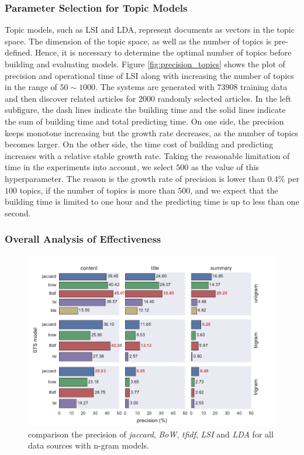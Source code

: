 \subsubsection{Parameter Selection for Topic Models}


Topic models, such as LSI and LDA, represent documents as vectors in the topic space. The dimension of the topic space, as well as the number of topics is pre-defined. Hence, it is necessary to determine the optimal number of topics before building and evaluating models. Figure \ref{fig:precision_topics} shows the plot of precision and operational time of LSI along with increasing the number of topics in the range of $50 \sim 1000$. The systems are generated with $73908$ training data and then discover related articles for $2000$ randomly selected articles. In the left subfigure, the dash lines indicate the building time and the solid lines indicate the sum of building time and total predicting time. On one side, the precision keeps monotone increasing  but the growth rate decreases, as the number of topics becomes larger. On the other side, the time cost of building and predicting increases with a relative stable growth rate. Taking the reasonable limitation of time in the experiments into account, we select $500$ as the value of this hyperparameter. The reason is the growth rate of precision is lower than $0.4\%$ per $100$ topics, if the number of topics is more than $500$, and we expect that the building time is limited to one hour and the predicting time is up to less than one second. 

\subsubsection{Overall Analysis of Effectiveness}

\begin{figure}[!htb]
    \centering
    \includegraphics[width=\textwidth]{fig/precision_2_3}
    \caption{comparison the precision of \textit{jaccard}, \textit{BoW}, \textit{tfidf}, \textit{LSI} and \textit{LDA} for all data sources  with n-gram models. }
    \label{fig:precision_2_3}
\end{figure}

